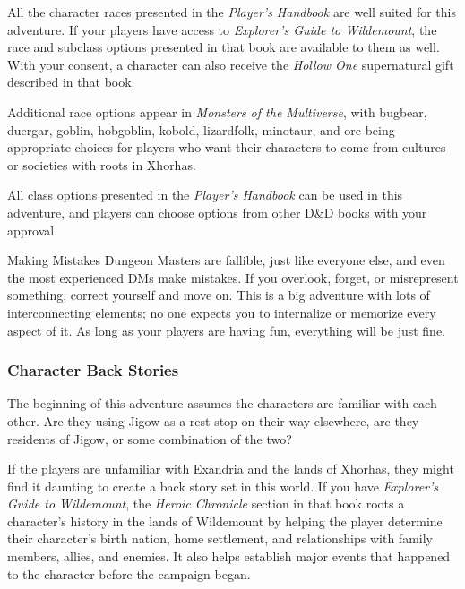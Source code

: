 \documentclass[10pt,a4paper,twoside,bg=print,twocolumn,openany,nodeprecatedcode]{dndbook}
\begin{document}
All the character races presented in the \textit{Player's Handbook} are well suited for this adventure. If your players have access to \textit{Explorer's Guide to Wildemount}, the race and subclass options presented in that book are available to them as well. With your consent, a character can also receive the \textit{Hollow One} supernatural gift described in that book.

Additional race options appear in \textit{Monsters of the Multiverse}, with bugbear, duergar, goblin, hobgoblin, kobold, lizardfolk, minotaur, and orc being appropriate choices for players who want their characters to come from cultures or societies with roots in Xhorhas.

All class options presented in the \textit{Player's Handbook} can be used in this adventure, and players can choose options from other D\&D books with your approval.

\begin{DndSidebar}[float=!b]{Making Mistakes}
Dungeon Masters are fallible, just like everyone else, and even the most experienced DMs make mistakes. If you overlook, forget, or misrepresent something, correct yourself and move on. This is a big adventure with lots of interconnecting elements; no one expects you to internalize or memorize every aspect of it. As long as your players are having fun, everything will be just fine.



\end{DndSidebar}

\subsubsection{Character Back Stories}
The beginning of this adventure assumes the characters are familiar with each other. Are they using Jigow as a rest stop on their way elsewhere, are they residents of Jigow, or some combination of the two?

If the players are unfamiliar with Exandria and the lands of Xhorhas, they might find it daunting to create a back story set in this world. If you have \textit{Explorer's Guide to Wildemount}, the \textit{Heroic Chronicle} section in that book roots a character's history in the lands of Wildemount by helping the player determine their character's birth nation, home settlement, and relationships with family members, allies, and enemies. It also helps establish major events that happened to the character before the campaign began.
\end{document}
